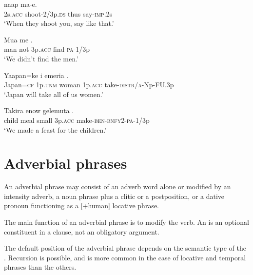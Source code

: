 \ea%
\label{ex:x852}
\gll {}   naap  ma-e. \\
    2s.\textsc{acc}  shoot-2/3p.\textsc{ds}  thus  say-\textsc{imp}.2s  \\
\glt`When they shoot you, say like that.'
\z





\ea%
\label{ex:x849}
\gll Mua  me   . \\
   man  not  3p.\textsc{acc}  find-\textsc{pa}-1/3p   \\
\glt`We didn't find the men.'
\z





\ea%
\label{ex:x850}
\gll Yaapan=ke  i  emeria   . \\
   Japan=\textsc{cf}  1p.\textsc{unm}  woman  1p.\textsc{acc}  take-\textsc{distr}/\textsc{a}-Np-FU.3p   \\
\glt`Japan will take all of us women.'
\z





\ea%
\label{ex:x851}
\gll Takira  enow  gelemuta   . \\
   child  meal  small  3p.\textsc{acc}  make-\textsc{ben}-\textsc{bnfy}2-\textsc{pa}-1/3p   \\
\glt`We made a feast for the children.'
\z





\section{Adverbial phrases}
{}
An adverbial phrase may consist of an adverb word alone or modified by an intensity adverb, a noun phrase plus a clitic or a postposition, or a dative pronoun functioning as a [+human] locative phrase.

The main function of an adverbial phrase is to modify the verb. An  is an optional constituent in a clause, not an obligatory argument. 

The default position of the adverbial phrase depends on the semantic type of the . Recursion is possible, and is more common in the case of locative and temporal phrases than the others.

